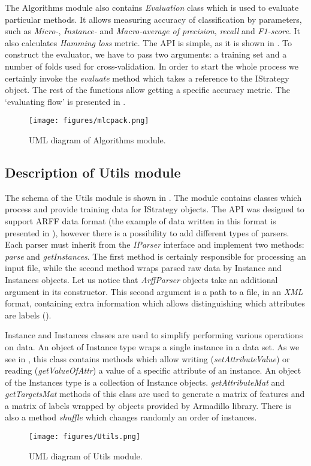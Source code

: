 The Algorithms module also contains \textit{Evaluation} class which is used to evaluate particular methods. It allows measuring accuracy of classification by parameters, such as \textit{Micro-}, \textit{Instance-} and \textit{Macro-average of precision}, \textit{recall} and \textit{F1-score}. It also calculates \textit{Hamming loss} metric. The API is simple, as it is shown in . To construct the evaluator, we have to pass two arguments: a training set and a number of folds used for cross-validation. In order to start the whole process we certainly invoke the \textit{evaluate} method which takes a reference to the IStrategy object. The rest of the functions allow getting a specific accuracy metric. The `evaluating flow' is presented in .

\begin{figure}
\centering
\caption{UML diagram of Algorithms module.}
\label{fig:alg_sh}
\texttt{[image: figures/mlcpack.png]}
\end{figure}

\subsection{Description of Utils module}

The schema of the Utils module is shown in . The module contains classes which process and provide training data for IStrategy objects. The API was designed to support ARFF data format (the example of data written in this format is presented in ), however there is a possibility to add different types of parsers. Each parser must inherit from the \textit{IParser} interface and implement two methods: \textit{parse} and \textit{getInstances}. The first method is certainly responsible for processing an input file, while the second method wraps parsed raw data by Instance and Instances objects. Let us notice that \textit{ArffParser} objects take an additional argument in its constructor. This second argument is a path to a file, in an \textit{XML} format, containing extra information which allows distinguishing which attributes are labels ().

Instance and Instances classes are used to simplify performing various operations on data. An object of Instance type wraps a single instance in a data set. As we see in , this class contains methods which allow writing (\textit{setAttributeValue}) or reading (\textit{getValueOfAttr}) a value of a specific attribute of an instance. An object of the Instances type is a collection of Instance objects. \textit{getAttributeMat} and \textit{getTargetsMat} methods of this class are used to generate a matrix of features and a matrix of labels wrapped by objects provided by Armadillo library. There is also a method \textit{shuffle} which changes randomly an order of instances.  

\begin{figure}
\centering
\caption{UML diagram of Utils module.}
\label{fig:utils_sh}
\texttt{[image: figures/Utils.png]}
\end{figure}


